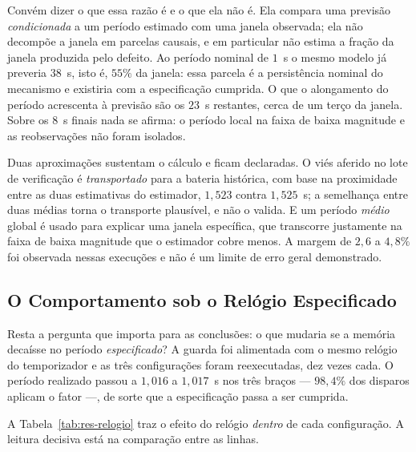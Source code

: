 Convém dizer o que essa razão é e o que ela não é. Ela compara uma previsão
\emph{condicionada} a um período estimado com uma janela observada; ela não decompõe a
janela em parcelas causais, e em particular não estima a fração da janela produzida pelo
defeito. Ao período nominal de $1$~s o mesmo modelo já preveria $38$~s, isto é, $55\%$ da
janela: essa parcela é a persistência nominal do mecanismo e existiria com a
especificação cumprida. O que o alongamento do período acrescenta à previsão são os
$23$~s restantes, cerca de um terço da janela. Sobre os $8$~s finais nada se afirma: o
período local na faixa de baixa magnitude e as reobservações não foram isolados.

Duas aproximações sustentam o cálculo e ficam declaradas. O viés aferido no lote de
verificação é \emph{transportado} para a bateria histórica, com base na proximidade entre
as duas estimativas do estimador, $1{,}523$ contra $1{,}525$~s; a semelhança entre duas
médias torna o transporte plausível, e não o valida. E um período \emph{médio} global é
usado para explicar uma janela específica, que transcorre justamente na faixa de baixa
magnitude que o estimador cobre menos. A margem de $2{,}6$ a $4{,}8\%$ foi observada nessas
execuções e não é um limite de erro geral demonstrado.

\subsection{O Comportamento sob o Relógio Especificado}
\label{sec:res-relogio-consistente}

Resta a pergunta que importa para as conclusões: o que mudaria se a memória decaísse no
período \emph{especificado}? A guarda foi alimentada com o mesmo relógio do temporizador
e as três configurações foram reexecutadas, dez vezes cada. O período realizado passou a
$1{,}016$ a $1{,}017$~s nos três braços --- $98{,}4\%$ dos disparos aplicam o fator
---, de sorte que
a especificação passa a ser cumprida.

A Tabela~\ref{tab:res-relogio} traz o efeito do relógio \emph{dentro} de cada
configuração. A leitura decisiva está na comparação entre as linhas.


